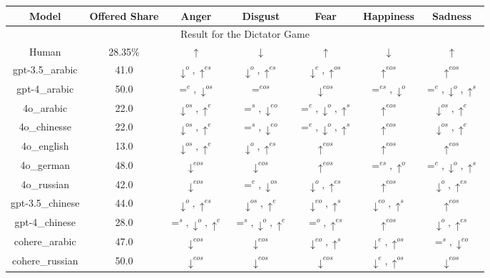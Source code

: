 \documentclass{article}
\begin{document}
\begin{table}
    \centering
    \begin{tabular}{ccccccc}
         Model & Offered Share & Anger & Disgust & Fear & Happiness & Sadness \\
         \hline
         \multicolumn{7}{c}{Result for the Dictator Game}\\

Human        & 28.35\%  & $\uparrow$ & $\downarrow$ & $\uparrow$ & $\downarrow$ & $\uparrow$ \\        
gpt-3.5\_arabic & 41.0 & $\downarrow^{o},\uparrow^{es}$ & $\downarrow^{o},\uparrow^{es}$ & $\downarrow^{e},\uparrow^{os}$ & $\uparrow^{eos}$ & $\uparrow^{eos}$ \\
gpt-4\_arabic & 50.0 & $=^{e},\downarrow^{os}$ & $=^{eos}$ & $\downarrow^{eos}$ & $=^{es},\downarrow^{o}$ & $=^{e},\downarrow^{o},\uparrow^{s}$ \\
4o\_arabic & 22.0 & $\downarrow^{os},\uparrow^{e}$ & $=^{s},\downarrow^{eo}$ & $=^{e},\downarrow^{o},\uparrow^{s}$ & $\uparrow^{eos}$ & $\downarrow^{os},\uparrow^{e}$ \\
4o\_chinesse & 22.0 & $\downarrow^{os},\uparrow^{e}$ & $=^{s},\downarrow^{eo}$ & $=^{e},\downarrow^{o},\uparrow^{s}$ & $\uparrow^{eos}$ & $\downarrow^{os},\uparrow^{e}$ \\
4o\_english & 13.0 & $\downarrow^{os},\uparrow^{e}$ & $\downarrow^{o},\uparrow^{es}$ & $\uparrow^{eos}$ & $\uparrow^{eos}$ & $\uparrow^{eos}$ \\
4o\_german & 48.0 & $\downarrow^{eos}$ & $\downarrow^{eos}$ & $\uparrow^{eos}$ & $=^{es},\uparrow^{o}$ & $=^{e},\downarrow^{o},\uparrow^{s}$ \\
4o\_russian & 42.0 & $\downarrow^{eos}$ & $=^{e},\downarrow^{os}$ & $\downarrow^{o},\uparrow^{es}$ & $\uparrow^{eos}$ & $\downarrow^{o},\uparrow^{es}$ \\
gpt-3.5\_chinese & 44.0 & $\downarrow^{o},\uparrow^{es}$ & $\downarrow^{os},\uparrow^{e}$ & $\downarrow^{eo},\uparrow^{s}$ & $\downarrow^{eo},\uparrow^{s}$ & $\uparrow^{eos}$ \\
gpt-4\_chinese & 28.0 & $=^{s},\downarrow^{o},\uparrow^{e}$ & $=^{s},\downarrow^{o},\uparrow^{e}$ & $=^{o},\uparrow^{es}$ & $\uparrow^{eos}$ & $\downarrow^{o},\uparrow^{es}$ \\
cohere\_arabic & 47.0 & $\downarrow^{eos}$ & $\downarrow^{eos}$ & $\downarrow^{eo},\uparrow^{s}$ & $\downarrow^{e},\uparrow^{os}$ & $=^{s},\downarrow^{eo}$ \\
cohere\_russian & 50.0 & $\downarrow^{eos}$ & $\downarrow^{eos}$ & $\downarrow^{eos}$ & $\downarrow^{e},\uparrow^{os}$ & $\downarrow^{eos}$ \\

\end{tabular}
\end{table}
\end{document}
